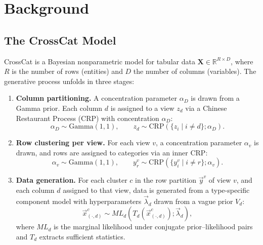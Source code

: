 \documentclass[11pt]{article}
\begin{document}
\section{Background}
\label{sec:background}

\subsection{The CrossCat Model}

CrossCat \citep{mansinghka2016crosscat} is a Bayesian nonparametric
model for tabular data $\mathbf{X} \in \mathbb{R}^{R \times D}$, where
$R$ is the number of rows (entities) and $D$ the number of columns
(variables). The generative process unfolds in three stages:

\begin{enumerate}
  \item \textbf{Column partitioning.} A concentration parameter
    $\alpha_D$ is drawn from a Gamma prior. Each column $d$ is assigned
    to a view $z_d$ via a Chinese Restaurant Process (CRP) with
    concentration $\alpha_D$:
    \begin{equation}
      \alpha_D \sim \mathrm{Gamma}(1, 1), \qquad
      z_d \sim \mathrm{CRP}(\{z_i \mid i \neq d\}; \alpha_D).
    \end{equation}

  \item \textbf{Row clustering per view.} For each view $v$, a
    concentration parameter $\alpha_v$ is drawn, and rows are assigned to
    categories via an inner CRP:
    \begin{equation}
      \alpha_v \sim \mathrm{Gamma}(1, 1), \qquad
      y_r^v \sim \mathrm{CRP}(\{y_i^v \mid i \neq r\}; \alpha_v).
    \end{equation}

  \item \textbf{Data generation.} For each cluster $c$ in the row
    partition $\vec{y}^v$ of view $v$, and each column $d$ assigned to
    that view, data is generated from a type-specific component model
    with hyperparameters $\vec{\lambda}_d$ drawn from a vague prior
    $V_d$:
    \begin{equation}
      \vec{x}^c_{(\cdot,d)} \sim ML_d(T_d(\vec{x}^c_{(\cdot,d)}); \vec{\lambda}_d),
    \end{equation}
    where $ML_d$ is the marginal likelihood under conjugate
    prior--likelihood pairs and $T_d$ extracts sufficient statistics.
\end{enumerate}
\end{document}
